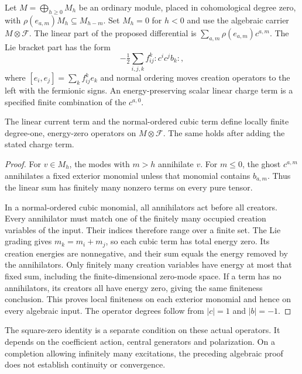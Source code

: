 Let $M=\bigoplus_{h\ge0}M_h$ be an ordinary module, placed in cohomological degree zero, with $\rho(e_{a,m})M_h\subseteq M_{h-m}$.
Set $M_h=0$ for $h<0$ and use the algebraic carrier $M\otimes\mathcal F$.
The linear part of the proposed differential is
$\sum_{a,m}\rho(e_{a,m})c^{a,m}$.
The Lie bracket part has the form
\[
-\tfrac12\sum_{i,j,k} f_{ij}^{k}{:}c^i c^j b_k{:},
\]
where $[e_i,e_j]=\sum_kf_{ij}^ke_k$ and normal ordering moves creation operators to the left with the fermionic signs.
An energy-preserving scalar linear charge term is a specified finite combination of the $c^{a,0}$.

\begin{lemma}\label{lem:fl20-ghost-domain}
The linear current term and the normal-ordered cubic term define locally finite degree-one, energy-zero operators on $M\otimes\mathcal F$.
The same holds after adding the stated charge term.
\end{lemma}
\begin{proof}
For $v\in M_h$, the modes with $m>h$ annihilate $v$.
For $m\le0$, the ghost $c^{a,m}$ annihilates a fixed exterior monomial unless that monomial contains $b_{a,m}$.
Thus the linear sum has finitely many nonzero terms on every pure tensor.

In a normal-ordered cubic monomial, all annihilators act before all creators.
Every annihilator must match one of the finitely many occupied creation variables of the input.
Their indices therefore range over a finite set.
The Lie grading gives $m_k=m_i+m_j$, so each cubic term has total energy zero.
Its creation energies are nonnegative, and their sum equals the energy removed by the annihilators.
Only finitely many creation variables have energy at most that fixed sum, including the finite-dimensional zero-mode space.
If a term has no annihilators, its creators all have energy zero, giving the same finiteness conclusion.
This proves local finiteness on each exterior monomial and hence on every algebraic input.
The operator degrees follow from $|c|=1$ and $|b|=-1$.
\end{proof}

The square-zero identity is a separate condition on these actual operators.
It depends on the coefficient action, central generators and polarization.
On a completion allowing infinitely many excitations, the preceding algebraic proof does not establish continuity or convergence.

